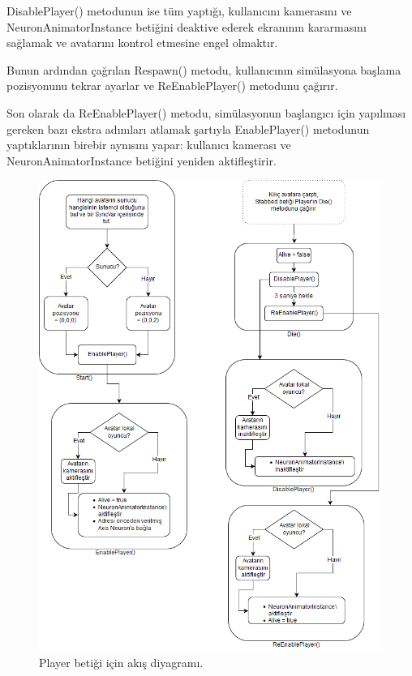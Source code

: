 \documentclass[a4paper, 12pt, titlepage]{article}
\begin{document}
DisablePlayer() metodunun ise tüm yaptığı, kullanıcını kamerasını ve NeuronAnimatorInstance
betiğini deaktive ederek ekranının kararmasını sağlamak ve avatarını kontrol etmesine engel
olmaktır.

Bunun ardından çağrılan Respawn() metodu, kullanıcının simülasyona başlama pozisyonunu tekrar
ayarlar ve ReEnablePlayer() metodunu çağırır.

Son olarak da ReEnablePlayer() metodu, simülasyonun başlangıcı için yapılması gereken bazı ekstra
adımları atlamak şartıyla EnablePlayer() metodunun yaptıklarının birebir aynısını yapar: kullanıcı
kamerası ve NeuronAnimatorInstance betiğini yeniden aktifleştirir.

\begin{figure}
    \centering
        \includegraphics[width=6in]{images/player}
    \caption{Player betiği için akış diyagramı.}
    \label{player}
\end{figure}
\end{document}
